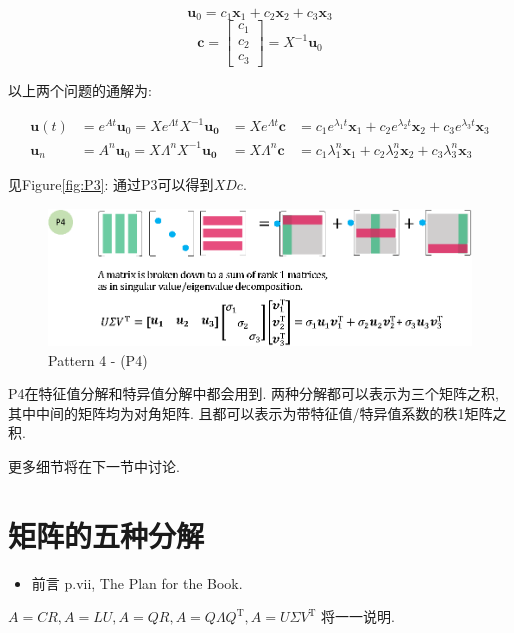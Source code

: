 \documentclass[letterpaper]{article}
\DeclareRobustCommand\transp{^{\mathrm{T}}}
\begin{document}
\begin{equation*}
  \bm{u}_0 = c_1 \bm{x}_1 + c_2 \bm{x}_2 + c_3 \bm{x}_3
\end{equation*}
\begin{equation*}
  \bm{c} =
  \begin{bmatrix}
    c_1\\
    c_2\\
    c_3
  \end{bmatrix} = X^{-1} \bm{u}_0
\end{equation*}

以上两个问题的通解为: 

\begin{align*}
  \bm{u}(t) &= e^{At} \bm{u}_0 = X e^{\Lambda t} X^{-1} \bm{u_0} &= X e^{\Lambda t} \bm{c} &= c_1 e^{\lambda_1 t} \bm{x}_1 + c_2 e^{\lambda_2 t} \bm{x}_2 + c_3 e^{\lambda_3 t} \bm{x}_3\\
  \bm{u}_n &= A^n \bm{u}_0 = X \Lambda^n X^{-1} \bm{u_0} &= X \Lambda^n \bm{c} &= c_1 \lambda_1^n \bm{x}_1 + c_2 \lambda_2^n \bm{x}_2 + c_3 \lambda_3^n \bm{x}_3
\end{align*}

见Figure\ref{fig:P3}: 通过P3可以得到$XDc$. 

\begin{figure}[H]
  \centering
  \includegraphics[scale=0.8]{Pattern4.eps}
  \caption{Pattern 4 - (P4)}
\end{figure}

P4在特征值分解和特异值分解中都会用到. 
两种分解都可以表示为三个矩阵之积, 其中中间的矩阵均为对角矩阵. 
且都可以表示为带特征值/特异值系数的秩1矩阵之积. 

更多细节将在下一节中讨论. 

\clearpage

\section{矩阵的五种分解}

\begin{itemize}
  \item 前言 p.vii, The Plan for the Book.
\end{itemize}
$A=CR, A=LU, A=QR, A=Q \Lambda Q\transp, A=U \Sigma V\transp$ 将一一说明.
\end{document}
